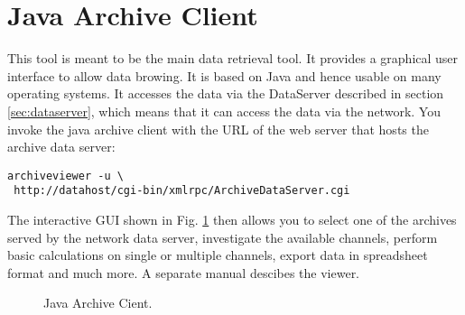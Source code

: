 \section{Java Archive Client} \label{sec:javaclient}
This tool is meant to be the main data retrieval tool. It provides a
graphical user interface to allow data browing. It is based on Java
and hence usable on many operating systems. It accesses the data via
the DataServer described in section \ref{sec:dataserver}, which means
that it can access the data via the network.  You invoke the java
archive client with the URL of the web server that hosts the archive
data server:

\begin{lstlisting}[frame=none,keywordstyle=\sffamily]
 archiveviewer -u \
 http://datahost/cgi-bin/xmlrpc/ArchiveDataServer.cgi
\end{lstlisting}

\noindent The interactive GUI shown in Fig. \ref{fig:javatool} then
allows you to select one of the archives served by the network data
server, investigate the available channels, perform basic calculations
on single or multiple channels, export data in spreadsheet format and
much more.
A separate manual descibes the viewer.

\medskip

\begin{figure}[htb]
\begin{center}
\end{center}
\caption{\label{fig:javatool}Java Archive Cient.}
\end{figure}

